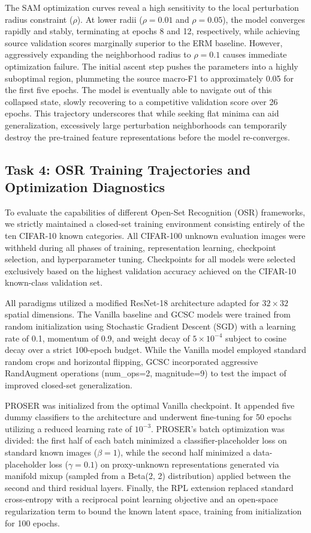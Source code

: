 \documentclass{article}
\begin{document}
The SAM optimization curves reveal a high sensitivity to the local perturbation radius constraint ($\rho$). At lower radii ($\rho=0.01$ and $\rho=0.05$), the model converges rapidly and stably, terminating at epochs 8 and 12, respectively, while achieving source validation scores marginally superior to the ERM baseline. However, aggressively expanding the neighborhood radius to $\rho=0.1$ causes immediate optimization failure. The initial ascent step pushes the parameters into a highly suboptimal region, plummeting the source macro-F1 to approximately 0.05 for the first five epochs. The model is eventually able to navigate out of this collapsed state, slowly recovering to a competitive validation score over 26 epochs. This trajectory underscores that while seeking flat minima can aid generalization, excessively large perturbation neighborhoods can temporarily destroy the pre-trained feature representations before the model re-converges.

\subsection{Task 4: OSR Training Trajectories and Optimization Diagnostics}
\label{appendix:task4_training}

To evaluate the capabilities of different Open-Set Recognition (OSR) frameworks, we strictly maintained a closed-set training environment consisting entirely of the ten CIFAR-10 known categories. All CIFAR-100 unknown evaluation images were withheld during all phases of training, representation learning, checkpoint selection, and hyperparameter tuning. Checkpoints for all models were selected exclusively based on the highest validation accuracy achieved on the CIFAR-10 known-class validation set.

All paradigms utilized a modified ResNet-18 architecture adapted for $32 \times 32$ spatial dimensions. The Vanilla baseline and GCSC models were trained from random initialization using Stochastic Gradient Descent (SGD) with a learning rate of 0.1, momentum of 0.9, and weight decay of $5 \times 10^{-4}$ subject to cosine decay over a strict 100-epoch budget. While the Vanilla model employed standard random crops and horizontal flipping, GCSC incorporated aggressive RandAugment operations (num\_ops=2, magnitude=9) to test the impact of improved closed-set generalization. 

PROSER was initialized from the optimal Vanilla checkpoint. It appended five dummy classifiers to the architecture and underwent fine-tuning for 50 epochs utilizing a reduced learning rate of $10^{-3}$. PROSER's batch optimization was divided: the first half of each batch minimized a classifier-placeholder loss on standard known images ($\beta=1$), while the second half minimized a data-placeholder loss ($\gamma=0.1$) on proxy-unknown representations generated via manifold mixup (sampled from a Beta(2, 2) distribution) applied between the second and third residual layers. Finally, the RPL extension replaced standard cross-entropy with a reciprocal point learning objective and an open-space regularization term to bound the known latent space, training from initialization for 100 epochs.
\end{document}
